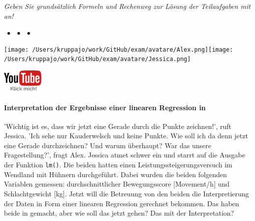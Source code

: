 \documentclass[a4paper, 9pt]{scrartcl}\usepackage[]{graphicx}\usepackage[]{xcolor}
\begin{document}
\textit{Geben Sie grundsätzlich Formeln und Rechenweg zur Lösung der Teilaufgaben mit an!} \\[1Ex]
 

 
\ifcollection
\begin{flushright}
\tiny\vspace{-3Ex}
\textbf{\examinhaltstart}
\exammodulestat $\;\bullet$
\exammodulestatbbv $\;\bullet$
\exammodulestatversuch $\;\bullet$
\exammodulebiostat
\vspace{-4Ex}
\end{flushright}
\begin{minipage}[t]{0.5\textwidth}
\texttt{[image: /Users/kruppajo/work/GitHub/exam/avatare/Alex.png]}\hspace{-4mm}\texttt{[image: /Users/kruppajo/work/GitHub/exam/avatare/Jessica.png]}
\end{minipage}
\begin{minipage}[t]{0.5\textwidth}
\hfill
\href{https://youtu.be/I48edRN4bAU}{\includegraphics[width = 2cm]{img/youtube}}
\end{minipage}
\fi



\ifcollection
\paragraph{Interpretation der Ergebnisse einer linearen Regression in \Rlogo}
\fi

'Wichtig ist es, dass wir jetzt eine Gerade durch die Punkte zeichnen!', ruft Jessica. 'Ich sehe nur Kauderwelsch und keine Punkte. Wie soll ich da denn jetzt eine Gerade durchzeichnen? Und warum überhaupt? War das unsere Fragestellung?', fragt Alex. Jessica atmet schwer ein und starrt auf die \Rlogo Ausgabe der Funktion \texttt{lm()}. Die beiden hatten einen Leistungssteigerungsversuch im Wendland mit Hühnern durchgeführt. Dabei wurden die beiden folgenden Variablen gemessen: durchschnittlicher Bewegungsscore [Movement/h] und Schlachtgewicht [kg]. Jetzt will die Betreuung von den beiden die Interpretierung der Daten in Form einer linearen Regression gerechnet bekommen. Das haben beide in \Rlogo gemacht, aber wie soll das jetzt gehen? Das mit der Interpretation?
\end{document}
